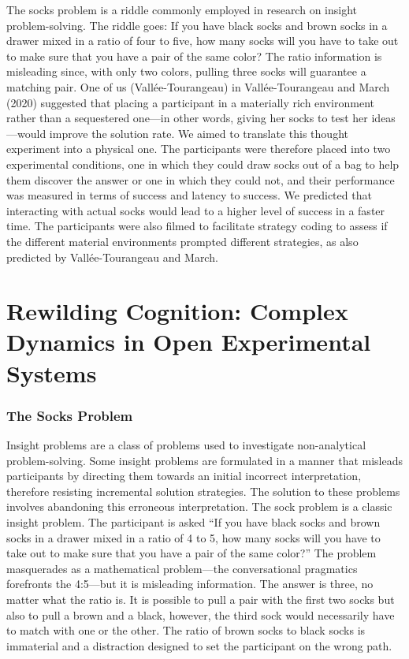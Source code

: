 The socks problem is a riddle commonly employed in research on insight
problem-solving. The riddle goes: If you have black socks and brown
socks in a drawer mixed in a ratio of four to five, how many socks will
you have to take out to make sure that you have a pair of the same
color? The ratio information is misleading since, with only two colors,
pulling three socks will guarantee a matching pair. One of us
(Vallée-Tourangeau) in Vallée-Tourangeau and March (2020) suggested that
placing a participant in a materially rich environment rather than a
sequestered one---in other words, giving her socks to test her
ideas---would improve the solution rate. We aimed to translate this
thought experiment into a physical one. The participants were therefore
placed into two experimental conditions, one in which they could draw
socks out of a bag to help them discover the answer or one in which they
could not, and their performance was measured in terms of success and
latency to success. We predicted that interacting with actual socks
would lead to a higher level of success in a faster time. The
participants were also filmed to facilitate strategy coding to assess if
the different material environments prompted different strategies, as
also predicted by Vallée-Tourangeau and March.

\hypertarget{rewilding-cognition-complex-dynamics-in-open-experimental-systems}{%
\section{Rewilding Cognition: Complex Dynamics in Open Experimental
Systems}\label{rewilding-cognition-complex-dynamics-in-open-experimental-systems}}

\hypertarget{the-socks-problem}{%
\subsubsection{The Socks Problem}\label{the-socks-problem}}

Insight problems are a class of problems used to investigate
non-analytical problem-solving. Some insight problems are formulated in
a manner that misleads participants by directing them towards an initial
incorrect interpretation, therefore resisting incremental solution
strategies. The solution to these problems involves abandoning this
erroneous interpretation. The sock problem is a classic insight problem.
The participant is asked ``If you have black socks and brown socks in a
drawer mixed in a ratio of 4 to 5, how many socks will you have to take
out to make sure that you have a pair of the same color?'' The problem
masquerades as a mathematical problem---the conversational pragmatics
forefronts the 4:5---but it is misleading information. The answer is
three, no matter what the ratio is. It is possible to pull a pair with
the first two socks but also to pull a brown and a black, however, the
third sock would necessarily have to match with one or the other. The
ratio of brown socks to black socks is immaterial and a distraction
designed to set the participant on the wrong path.

